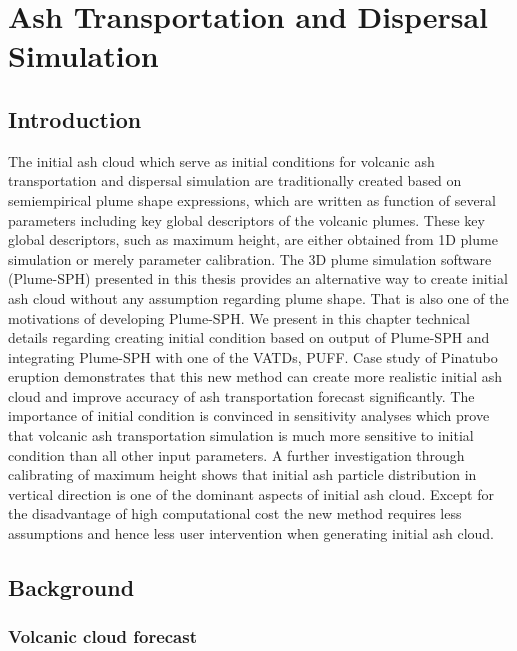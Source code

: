 \chapter{Ash Transportation and Dispersal Simulation} \label{chapter:ash-transportation}

\section{Introduction}

The initial ash cloud which serve as initial conditions for volcanic ash transportation and dispersal simulation are traditionally created based on semiempirical plume shape expressions, which are written as function of several parameters including key global descriptors of the volcanic plumes. These key global descriptors, such as maximum height, are either obtained from 1D plume simulation or merely parameter calibration. The 3D plume simulation software (Plume-SPH) presented in this thesis provides an alternative way to create initial ash cloud without any assumption regarding plume shape. That is also one of the motivations of developing Plume-SPH. 
We present in this chapter technical details regarding creating initial condition based on output of Plume-SPH and integrating Plume-SPH with one of the VATDs, PUFF. Case study of Pinatubo eruption demonstrates that this new method can create more realistic initial ash cloud and improve accuracy of ash transportation forecast significantly. The importance of initial condition is convinced in sensitivity analyses which prove that volcanic ash transportation simulation is much more sensitive to initial condition than all other input parameters. A further investigation through calibrating of maximum height shows that initial ash particle distribution in vertical direction is one of the dominant aspects of initial ash cloud.
Except for the disadvantage of high computational cost the new method requires less assumptions and hence less user intervention when generating initial ash cloud. 

\section{Background}

\subsection{Volcanic cloud forecast}

